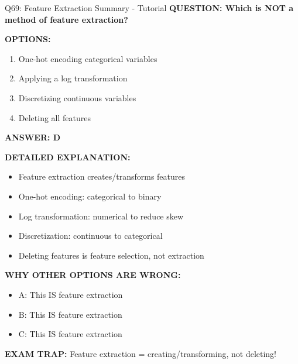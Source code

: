 \documentclass[8pt]{beamer}
\begin{document}
	\begin{frame}{Q69: Feature Extraction Summary - Tutorial}
		\fontsize{6.5}{7.5}\selectfont
		\textbf{QUESTION: Which is NOT a method of feature extraction?}
		
		\vspace{0.1cm}
		\textbf{OPTIONS:}
		\begin{enumerate}
			\item One-hot encoding categorical variables
			\item Applying a log transformation
			\item Discretizing continuous variables
			\item Deleting all features
		\end{enumerate}
		
		\vspace{0.1cm}
		\textcolor{myblue}{\textbf{ANSWER: D}}
		
		\vspace{0.1cm}
		\textbf{DETAILED EXPLANATION:}
		\begin{itemize}
			\item Feature extraction creates/transforms features
			\item One-hot encoding: categorical to binary
			\item Log transformation: numerical to reduce skew
			\item Discretization: continuous to categorical
			\item Deleting features is feature selection, not extraction
		\end{itemize}
		
		\vspace{0.1cm}
		\textcolor{myred}{\textbf{WHY OTHER OPTIONS ARE WRONG:}}
		\begin{itemize}
			\item \textcolor{myred}{A:} This IS feature extraction
			\item \textcolor{myred}{B:} This IS feature extraction
			\item \textcolor{myred}{C:} This IS feature extraction
		\end{itemize}
		
		\textcolor{myred}{\textbf{EXAM TRAP:}} Feature extraction = \textcolor{myblue}{creating/transforming, not deleting}!
	\end{frame}
	
\end{document}
